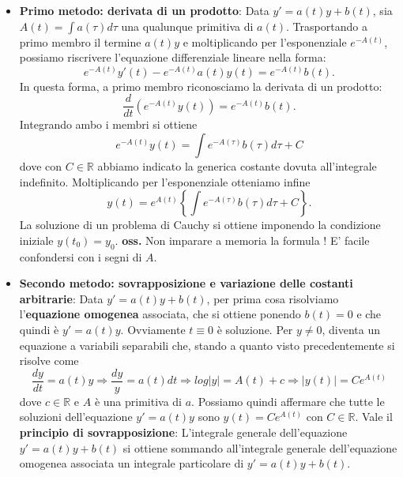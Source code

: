 \begin{itemize}
    \item \textbf{Primo metodo: derivata di un prodotto}:\newline
    Data $y' = a(t) y + b(t)$, sia $A(t) = \int a(\tau)d \tau$ una qualunque primitiva di $a(t)$. Trasportando a primo membro il termine $a(t) y$ e moltiplicando per l'esponenziale $e^{-A(t)}$, possiamo riscrivere l'equazione differenziale lineare nella forma:
    \[
        e^{-A(t)} y'(t) - e^{-A(t)}a(t) y(t) = e^{-A(t)}b(t).
    \]
    In questa forma, a primo membro riconosciamo la derivata di un prodotto:
    \[
        \frac{d}{dt} \left( e^{-A(t)} y(t) \right) = e^{-A(t)} b(t).
    \]
    Integrando ambo i membri si ottiene
    \[
        e^{-A(t)} y(t) = \int e^{-A(\tau)} b(\tau) d \tau + C
    \]
    dove con $C \in \mathbb{R}$ abbiamo indicato la generica costante dovuta all'integrale indefinito. Moltiplicando per l'esponenziale otteniamo infine
    \[
        y(t) = e^{A(t)}\left\{ \int e^{-A(\tau)} b(\tau) d \tau + C \right\}.
    \]
    La soluzione di un problema di Cauchy si ottiene imponendo la condizione iniziale $y(t_0) = y_0$.
    \textbf{oss.} Non imparare a memoria la formula ! E' facile confondersi con i segni di $A$.
    \item \textbf{Secondo metodo: sovrapposizione e variazione delle costanti arbitrarie}:\newline
    Data $y' = a(t) y + b(t)$, per prima cosa risolviamo l'\textbf{equazione omogenea} associata, che si ottiene ponendo $b(t) = 0$ e che quindi è $y' = a(t) y$. Ovviamente $t \equiv 0$ è soluzione. Per $y\neq 0$, diventa un equazione a variabili separabili che, stando a quanto visto precedentemente si risolve come
    \[
        \frac{dy}{dt} = a(t) y \Rightarrow \frac{dy}{y} = a(t) dt \Rightarrow  log|y| = A(t) + c \Rightarrow |y(t)| = Ce^{A(t)}
    \]
    dove $c \in \mathbb{R}$ e $A$ è una primitiva di $a$.\newline
    \newline
    Possiamo quindi affermare che tutte le soluzioni dell'equazione $y'=a(t) y$ sono $y(t) = Ce^{A(t)}$ con $C \in \mathbb{R}$.\newline
    \newline
    Vale il \textbf{principio di sovrapposizione}:\newline
    L'integrale generale dell'equazione $y' = a(t) y + b(t)$ si ottiene sommando all'integrale generale dell'equazione omogenea associata un integrale particolare di $y' = a(t) y + b(t)$.\newline

\end{itemize}
